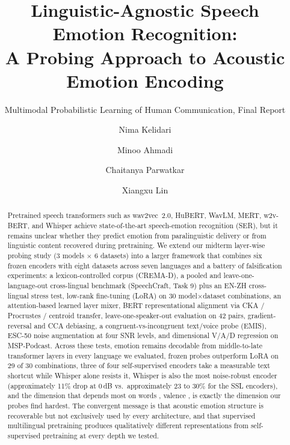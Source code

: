 \documentclass[sigconf,screen]{acmart}
\begin{document}
\title{Linguistic-Agnostic Speech Emotion Recognition:\\ A Probing Approach to Acoustic Emotion Encoding}
\subtitle{Multimodal Probabilistic Learning of Human Communication, Final Report}
\author{Nima Kelidari}
\author{Minoo Ahmadi}
\author{Chaitanya Parwatkar}
\author{Xiangxu Lin}
\renewcommand{\shortauthors}{Kelidari, Ahmadi, Parwatkar, Lin}
\begin{abstract}
Pretrained speech transformers such as wav2vec~2.0, HuBERT, WavLM, MERT, w2v-BERT, and Whisper achieve state-of-the-art speech-emotion recognition (SER), but it remains unclear whether they predict emotion from paralinguistic delivery or from linguistic content recovered during pretraining. We extend our midterm layer-wise probing study (3 models $\times$ 6 datasets) into a larger framework that combines six frozen encoders with eight datasets across seven languages and a battery of falsification experiments: a lexicon-controlled corpus (CREMA-D), a pooled and leave-one-language-out cross-lingual benchmark (SpeechCraft, Task 9) plus an EN-ZH cross-lingual stress test, low-rank fine-tuning (LoRA) on 30 model$\times$dataset combinations, an attention-based learned layer mixer, BERT representational alignment via CKA / Procrustes / centroid transfer, leave-one-speaker-out evaluation on 42 pairs, gradient-reversal and CCA debiasing, a congruent-vs-incongruent text/voice probe (EMIS), ESC-50 noise augmentation at four SNR levels, and dimensional V/A/D regression on MSP-Podcast. Across these tests, emotion remains decodable from middle-to-late transformer layers in every language we evaluated, frozen probes outperform LoRA on 29 of 30 combinations, three of four self-supervised encoders take a measurable text shortcut while Whisper alone resists it, Whisper is also the most noise-robust encoder (approximately 11\% drop at 0\,dB vs.\ approximately 23 to 30\% for the SSL encoders), and the dimension that depends most on words , valence , is exactly the dimension our probes find hardest. The convergent message is that acoustic emotion structure is recoverable but not exclusively used by every architecture, and that supervised multilingual pretraining produces qualitatively different representations from self-supervised pretraining at every depth we tested.
\end{abstract}
\maketitle
\end{document}
